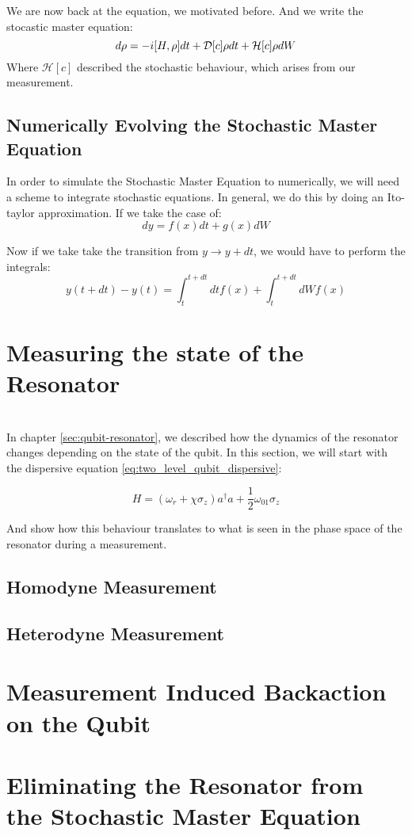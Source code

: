 We are now back at the equation, we motivated before. And we write the stocastic master equation:
\begin{equation}
    d\rho = -i \comm{H}{\rho}dt + \mathcal{D}[c]\rho dt + \mathcal{H}[c] \rho dW
\end{equation}
Where $\mathcal{H}[c]$ described the stochastic behaviour, which arises from our measurement.

\subsection{Numerically Evolving the Stochastic Master Equation}
In order to simulate the Stochastic Master Equation to numerically, we will need a scheme to integrate stochastic equations. In general, we do this by doing an Ito-taylor approximation. If we take the case of:
\begin{equation}
    dy = f(x)dt + g(x)dW 
\end{equation}

Now if we take take the transition from $y\to y + dt$, we would have to perform the integrals:
\begin{equation}
    y(t + dt) - y(t) = \int_t^{t+dt}dt f(x) + \int_t^{t+dt}dW f(x) 
\end{equation}



\section{Measuring the state of the Resonator}
 \\ \noindent
In chapter \ref{sec:qubit-resonator}, we described how the dynamics of the resonator changes depending on the state of the qubit. In this section, we will start with the dispersive equation \ref{eq:two_level_qubit_dispersive}:

\begin{equation}\label{eq:two_level_qubit_dispersive_2}
    H = (\omega_r + \chi \sigma_z) a^\dagger a + \frac12 \omega_{01} \sigma_z
\end{equation}

And show how this behaviour translates to what is seen in the phase space of the resonator during a measurement.


\subsection{Homodyne Measurement}


\subsection{Heterodyne Measurement}


\section{Measurement Induced Backaction on the Qubit}

\section{Eliminating the Resonator from the Stochastic Master Equation}